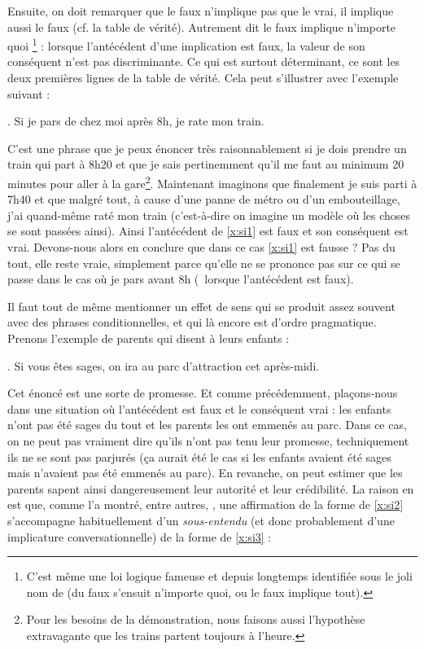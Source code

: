 \newpage

Ensuite, on doit remarquer   que le faux n'implique pas que le vrai,
il implique aussi le faux (cf. la table de vérité).  Autrement dit le
faux implique n'importe quoi%
\footnote{\label{efsq}C'est même une loi logique fameuse et depuis longtemps
  identifiée sous le joli nom de 
  (du faux s'ensuit n'importe quoi, ou le faux implique tout).}
: lorsque l'antécédent d'une implication
est faux, la valeur de son conséquent n'est pas discriminante.
Ce qui est surtout déterminant, ce sont les deux premières lignes de
  la table de vérité.
Cela peut s'illustrer avec l'exemple suivant :

\ex. \label{x:si1}
Si je pars de chez moi après 8h, je rate mon train.


C'est une phrase que je peux énoncer très raisonnablement si je dois
prendre un train qui part à 8h20 et que je sais pertinemment qu'il me
faut au minimum 20 minutes pour aller à la gare\footnote{Pour les
besoins de la démonstration, nous faisons aussi l'hypothèse extravagante
que les trains partent toujours à l'heure.}.  Maintenant imaginons
que finalement je suis parti à 7h40 et que malgré tout, à cause d'une
panne de métro ou d'un embouteillage, j'ai quand-même raté mon train
(c'est-à-dire on imagine un modèle où les choses se sont passées
ainsi).  Ainsi l'antécédent de \ref{x:si1} est faux et son
conséquent est vrai.  Devons-nous alors en conclure que dans ce cas
\ref{x:si1} est fausse ?  Pas du tout, elle reste vraie, simplement
parce qu'elle ne se prononce pas sur ce qui se passe dans le cas où je
pars avant 8h (\ie\ lorsque l'antécédent est faux).

Il faut tout de même mentionner un effet de sens qui se produit assez
souvent avec des phrases conditionnelles, et qui là encore est d'ordre
pragmatique. Prenons l'exemple de parents qui disent à leurs enfants :

\ex. \label{x:si2}
Si vous êtes sages, on ira au parc d'attraction cet après-midi.


Cet énoncé est une sorte de promesse.
Et comme précédemment,  plaçons-nous dans une situation où
l'antécédent est faux et le conséquent vrai : les enfants n'ont pas été
sages du tout et les parents les ont emmenés au parc.  Dans ce cas, on
ne peut pas vraiment dire qu'ils n'ont pas tenu leur promesse,
techniquement ils ne se sont pas parjurés (ça aurait été le cas si les
enfants avaient été sages mais n'avaient pas été emmenés au parc).  En
revanche, on peut estimer que les parents sapent ainsi dangereusement
leur autorité et leur crédibilité.  La raison en est que, comme l'a
montré, entre autres, \citet{Ducrot:84},  une
affirmation de la forme de 
\ref{x:si2} s'accompagne habituellement d'un \emph{sous-entendu} (et
donc probablement d'une implicature conversationnelle) de la forme de
\ref{x:si3} : 

